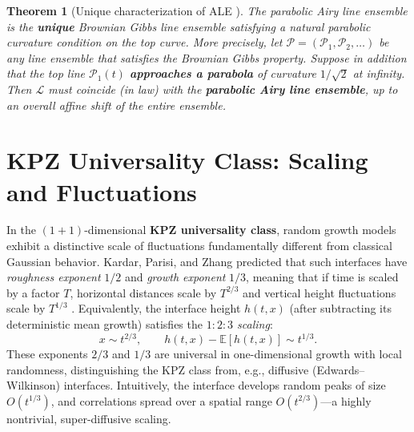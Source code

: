 \documentclass[letterpaper,11pt,oneside,reqno]{article}
\numberwithin{equation}{section}
\newtheorem{theorem}[proposition]{Theorem}
\theoremstyle{definition}
\begin{document}
\begin{theorem}[Unique characterization of ALE \cite{AggarwalHuang2023Characterization}]
	The parabolic Airy line ensemble is the \textbf{unique} Brownian Gibbs line ensemble satisfying a natural parabolic curvature condition on the top curve. More precisely, let $\boldsymbol{\mathcal{P}}=(\mathcal{P}_1,\mathcal{P}_2,\ldots)$ be any line ensemble that satisfies the Brownian Gibbs property. Suppose in addition that the top line $\mathcal{P}_1(t)$ \textbf{approaches a parabola} of curvature $1/\sqrt{2}$ at infinity. Then $\boldsymbol{\mathcal{L}}$ must coincide (in law) with the \textbf{parabolic Airy line ensemble}, up to an overall affine shift of the entire ensemble.
\end{theorem}





\section{KPZ Universality Class: Scaling and Fluctuations}

In the $(1+1)$-dimensional \textbf{KPZ universality class}, random growth models exhibit a distinctive scale of fluctuations fundamentally different from classical Gaussian behavior. Kardar, Parisi, and Zhang \cite{KPZ1986} predicted that such interfaces have \emph{roughness exponent} $1/2$ and \emph{growth exponent} $1/3$, meaning that if time is scaled by a factor $T$, horizontal distances scale by $T^{2/3}$ and vertical height fluctuations scale by $T^{1/3}$ \cite{remenik2023integrable}. Equivalently, the interface height $h(t,x)$ (after subtracting its deterministic mean growth) satisfies the \emph{$1:2:3$ scaling}:
\[ x \sim t^{2/3}, \qquad h(t,x)-\mathbb{E}[h(t,x)] \sim t^{1/3}. \]
These exponents $2/3$ and $1/3$ are universal in one-dimensional growth with local randomness, distinguishing the KPZ class from, e.g., diffusive (Edwards–Wilkinson) interfaces. Intuitively, the interface develops random peaks of size $O(t^{1/3})$, and correlations spread over a spatial range $O(t^{2/3})$—a highly nontrivial, super-diffusive scaling.
\end{document}
